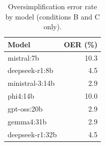 \begin{table}[H]
\caption{Oversimplification error rate by model (conditions B and C only).}
\label{tab:oer:model}
\centering
\begin{tabular}{lr}
\toprule
Model & OER (\%) \\
\midrule
mistral:7b & 10.3 \\
deepseek-r1:8b & 4.5 \\
ministral-3:14b & 2.9 \\
phi4:14b & 10.0 \\
gpt-oss:20b & 2.9 \\
gemma4:31b & 2.9 \\
deepseek-r1:32b & 4.5 \\
\bottomrule
\end{tabular}
\end{table}
